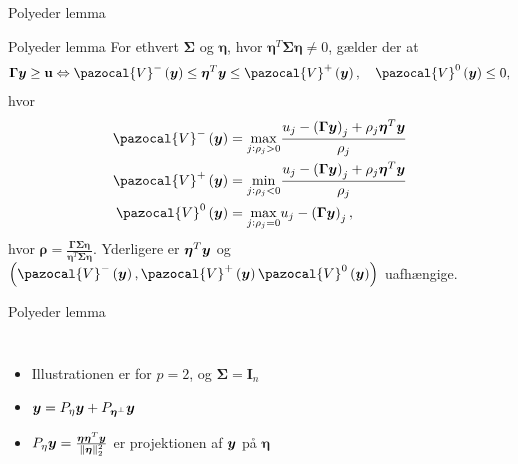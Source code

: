 \begin{frame}{Polyeder lemma}
\begin{block}{Polyeder lemma}
For ethvert $\boldsymbol \Sigma$ og $\boldsymbol \eta$, hvor $\boldsymbol \eta^T \boldsymbol  \Sigma \boldsymbol \eta \neq 0$, gælder der at
\begin{align*}
\boldsymbol \Gamma \vy \geq \textbf{u} \Leftrightarrow \pazocal{V}^- \del{\vy} \leq \boldsymbol \eta^T \vy \leq  \pazocal{V}^+\del{\vy}, \quad  \pazocal{V}^0 \del{\vy} \leq 0,
\end{align*}
hvor 
\begin{align*}
\pazocal{V}^- \del{\vy} & = \underset{j: \rho_j >0}{\max} \frac{u_j - \del{ \boldsymbol \Gamma \vy}_j + \rho_j \boldsymbol \eta^T \vy}{\rho_j} \\
\pazocal{V}^+ \del{\vy} & = \underset{j: \rho_j < 0}{\min} \frac{u_j - \del{ \boldsymbol \Gamma \vy}_j + \rho_j \boldsymbol \eta^T \vy}{\rho_j}  \\
\pazocal{V}^0 \del{\vy}  &=  \underset{j: \rho_j = 0}{\max} u_j -  \del{ \boldsymbol \Gamma \vy}_j
,\end{align*}
hvor $\boldsymbol \rho = \frac{\boldsymbol \Gamma \boldsymbol \Sigma \boldsymbol \eta}{\boldsymbol \eta^T \boldsymbol \Sigma \boldsymbol \eta}$. 
Yderligere er $\boldsymbol \eta^T \bm{y}$ og $\del{\pazocal{V}^- \del{\vy} , \pazocal{V}^+ \del{\vy} \pazocal{V}^0 \del{\vy}  }$ uafhængige.
\end{block}
\end{frame}

\begin{frame}{Polyeder lemma}
\begin{columns}[c]
\column{1.5in}
\begin{itemize}
\item Illustrationen er for $p = 2$, og $\boldsymbol \Sigma = \textbf{I}_n$
\item $\bm{y} = P_{\eta} \bm{y} + P_{\boldsymbol{\eta}^\perp} \bm{y}$
\item$ P_{\eta} \bm{y} = \frac{\boldsymbol \eta \boldsymbol \eta^T\bm{y}}{\Vert \boldsymbol \eta \Vert^2_2}  $ er projektionen af $\bm{y}$ på $\boldsymbol \eta$
\end{itemize}

\column{2.2in}

 \end{columns}
% 
%
\end{frame}


